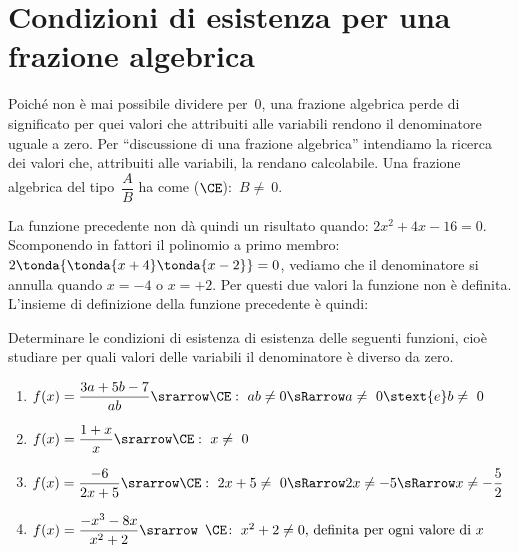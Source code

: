 \section{Condizioni di esistenza per una frazione algebrica}
\label{sec:frazalg_condizioniesistenza}

Poiché non è mai possibile dividere per~\(0\), una frazione algebrica perde 
di significato per quei valori che attribuiti alle variabili rendono il 
denominatore uguale a zero. 
Per ``discussione di una frazione algebrica'' intendiamo la ricerca dei 
valori che, attribuiti alle variabili, la rendano calcolabile. 
Una frazione algebrica del tipo~\(\dfrac{A}{B}\) ha come 
 (\(\CE\)):~\(B\neq~0\).

La funzione precedente non dà quindi un risultato quando: \(2x^2 +4x -16=0\).
Scomponendo in fattori il polinomio a primo membro: 
\(2 \tonda{\tonda{x+4}\tonda{x-2}}=0\),
vediamo che il denominatore si annulla quando \(x=-4\) o \(x=+2\).
Per questi due valori la funzione non è definita.
L'insieme di definizione della funzione precedente è quindi: 


\begin{esempio}{}{}
Determinare le condizioni di esistenza di esistenza delle seguenti funzioni, 
cioè studiare per quali valori delle variabili il denominatore è diverso da 
zero.

\begin{enumerate} [left=0mm]
\item \(f(x)=\dfrac{3a+5b-7}{ab} \srarrow 
\CE:~ ab \neq 0 \sRarrow a\neq~0 \stext{e} b\neq~0\)
\item \(f(x)=\dfrac{1+x}{x} \srarrow \CE:~ x\neq~0\)
\item \(f(x)=\dfrac{-6}{2x+5} \srarrow 
\CE:~ 2x+5\neq~0 \sRarrow 2x \neq -5 \sRarrow x\neq -\dfrac{5}{2}\)
\item \(f(x)=\dfrac{-x^{3}-8x}{x^{2}+2} \srarrow 
\begin{array}{l}\CE\!:~ x^{2}+2 \neq 0 
\text{, definita per ogni valore di } x
\end{array}\)
\end{enumerate}
\end{esempio}

